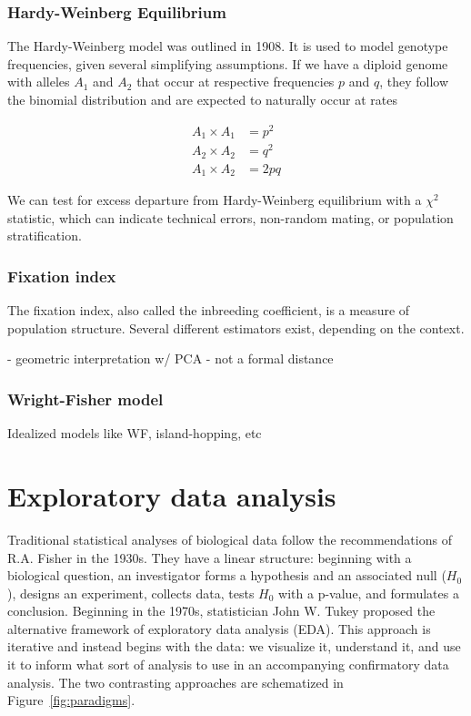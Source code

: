 \subsubsection{Hardy-Weinberg Equilibrium}

The Hardy-Weinberg model was outlined in 1908. It is used to model genotype frequencies, given several simplifying assumptions\citep{hartl2007principles_2}. If we have a diploid genome with alleles $A_{1}$ and $A_{2}$ that occur at respective frequencies $p$ and $q$, they follow the binomial distribution and are expected to naturally occur at rates
\begin{spacing}{1}
\begin{align*} 
A_{1} \times A_{1} &= p^{2}\\
A_{2} \times A_{2} &= q^{2}\\
A_{1} \times A_{2} &= 2pq
\end{align*} 
\end{spacing}

We can test for excess departure from Hardy-Weinberg equilibrium with a $\chi^2$ statistic, which can indicate technical errors, non-random mating, or population stratification.

\subsubsection{Fixation index}

The fixation index, also called the inbreeding coefficient, is a measure of population structure. Several different estimators exist, depending on the context\citep{bhatia_estimating_2013}.


- geometric interpretation w/ PCA\citep{peter_geometric_2022}
- not a formal distance\citep{arbisser_fst_2020}


\subsubsection{Wright-Fisher model}

Idealized models like WF, island-hopping, etc



\section{Exploratory data analysis}

Traditional statistical analyses of biological data follow the recommendations of R.A. Fisher in the 1930s\citep{holmes_modern_2019}. They have a linear structure: beginning with a biological question, an investigator forms a hypothesis and an associated null ($H_0$), designs an experiment, collects data, tests $H_0$ with a p-value, and formulates a conclusion. Beginning in the 1970s, statistician John W. Tukey proposed the alternative framework of exploratory data analysis (EDA)\citep{tukey_1977,hoaglin_john_2003}. This approach is iterative and instead begins with the data: we visualize it, understand it, and use it to inform what sort of analysis to use in an accompanying confirmatory data analysis. The two contrasting approaches are schematized in Figure~\ref{fig:paradigms}.

